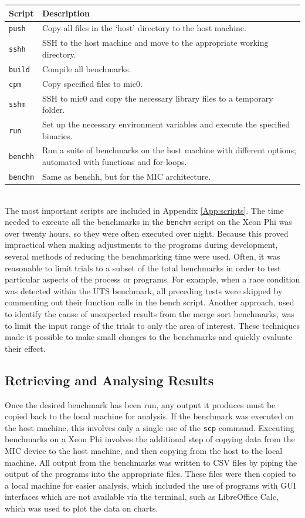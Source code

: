 \documentclass{report}
\begin{document}
\begin {center}
	\begin{tabular}{ | l | p{10cm} | }
	\hline
	{\bf Script} & {\bf Description} \\ \hline
	\verb!push! & Copy all files in the `host' directory to the host machine. \\ 
	\verb!sshh! & SSH to the host machine and move to the appropriate working directory. \\
	\verb!build! & Compile all benchmarks. \\
	\verb!cpm! & Copy specified files to mic0. \\
	\verb!sshm! & SSH to mic0 and copy the necessary library files to a temporary folder. \\
	\verb!run! & Set up the necessary environment variables and execute the specified binaries. \\
	\verb!benchh! & Run a suite of benchmarks on the host machine with different options; automated with functions and for-loops. \\
	\verb!benchm! & Same as benchh, but for the MIC architecture. \\ \hline
	\end{tabular}
\end{center}
\hfill\\
The most important scripts are included in Appendix \ref{App:scripts}. The time needed to execute all the benchmarks in the \verb!benchm! script on the Xeon Phi was over twenty hours, so they were often executed over night. Because this proved impractical when making adjustments to the programs during development, several methods of reducing the benchmarking time were used. Often, it was reasonable to limit trials to a subset of the total benchmarks in order to test particular aspects of the process or programs. For example, when a race condition was detected within the UTS benchmark, all preceding tests were skipped by commenting out their function calls in the bench script. Another approach, used to identify the cause of unexpected results from the merge sort benchmarks, was to limit the input range of the trials to only the area of interest. These techniques made it possible to make small changes to the benchmarks and quickly evaluate their effect.

\subsection{Retrieving and Analysing Results} \label{Sec:retandanalyseresults}
Once the desired benchmark has been run, any output it produces must be copied back to the local machine for analysis. If the benchmark was executed on the host machine, this involves only a single use of the \verb!scp! command. Executing benchmarks on a Xeon Phi involves the additional step of copying data from the MIC device to the host machine, and then copying from the host to the local machine. All output from the benchmarks was written to CSV files by piping the output of the programs into the appropriate files. These files were then copied to a local machine for easier analysis, which included the use of programs with GUI interfaces which are not available via the terminal, such as LibreOffice Calc, which was used to plot the data on charts.
\end{document}
